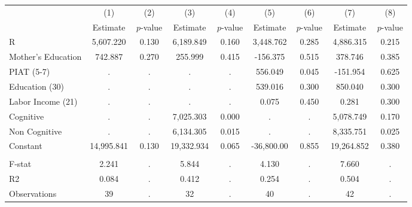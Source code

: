 \begin{tabular}{lcccccccc} \toprule
 & (1) & (2) & (3) & (4) & (5) & (6) & (7) & (8) \\ 
 & Estimate  & $p$-value  & Estimate  & $p$-value  & Estimate  & $p$-value  & Estimate  & $p$-value  \\  \midrule
R &  5,607.220 &     0.130 &  6,189.849 &     0.160 &  3,448.762 &     0.285 &  4,886.315 &     0.215 \\  
Mother's Education &   742.887 &     0.270 &   255.999 &     0.415 &  -156.375 &     0.515 &   378.746 &     0.385 \\  
PIAT (5-7) &         . &         . &         . &         . &   556.049 &     0.045 &  -151.954 &     0.625 \\  
Education (30) &         . &         . &         . &         . &   539.016 &     0.300 &   850.040 &     0.300 \\  
Labor Income (21) &         . &         . &         . &         . &     0.075 &     0.450 &     0.281 &     0.300 \\  
Cognitive &         . &         . &  7,025.303 &     0.000 &         . &         . &  5,078.749 &     0.170 \\  
Non Cognitive &         . &         . &  6,134.305 &     0.015 &         . &         . &  8,335.751 &     0.025 \\  
Constant & 14,995.841 &     0.130 & 19,332.934 &     0.065 & -36,800.00 &     0.855 & 19,264.852 &     0.380 \\  \\ \midrule
F-stat &     2.241 &         . &     5.844 &         . &     4.130 &         . &     7.660 &         . \\  
R2 &     0.084 &         . &     0.412 &         . &     0.254 &         . &     0.504 &         . \\  
Observations &    39 &         . &    32 &         . &    40 &         . &    42 &         . \\  
\bottomrule \end{tabular}
